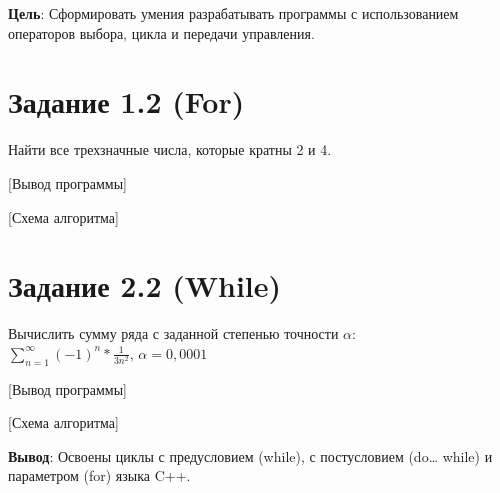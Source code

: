 \documentclass[variant=labwork]{bsuir}
\begin{document}
\maketitle

\textbf{Цель}: Сформировать умения разрабатывать программы с использованием
операторов выбора, цикла и передачи управления.

\section*{Задание 1.2 (For)}

Найти все трехзначные числа, которые кратны 2 и 4.


[Вывод программы]

[Схема алгоритма]

\section*{Задание 2.2 (While)}

Вычислить сумму ряда с заданной степенью точности $\alpha$:\\$\displaystyle
\sum_{n=1}^{\infty}(-1)^n*\frac{1}{3n^2}$, $\alpha=0,0001$


[Вывод программы]

[Схема алгоритма]

\textbf{Вывод}: Освоены циклы с предусловием (while), с постусловием (do\ldots
while) и параметром (for) языка C++.
\end{document}
